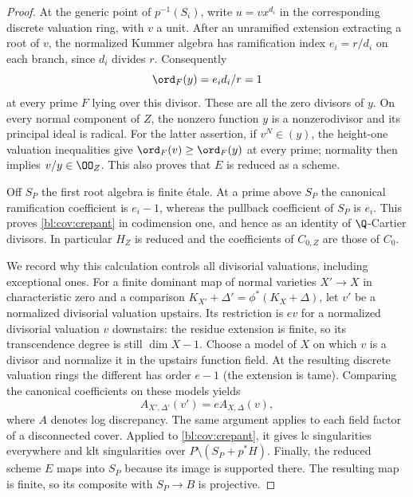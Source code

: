 \begin{proof}
At the generic point of $p^{-1}(S_i)$, write $u=vx^{d_i}$ in the
corresponding discrete valuation ring, with $v$ a unit.  After an
unramified extension extracting a root of $v$, the normalized Kummer
algebra has ramification index $e_i=r/d_i$ on each branch, since $d_i$
divides $r$.  Consequently
\[
 \ord_F(y)=e_id_i/r=1
\]
at every prime $F$ lying over this divisor.  These are all the zero
divisors of $y$.  On every normal component of $Z$, the nonzero function
$y$ is a nonzerodivisor and its principal ideal is radical.  For the
latter assertion, if $v^N\in(y)$, the height-one valuation inequalities
give $\ord_F(v)\geq\ord_F(y)$ at every prime; normality then implies
$v/y\in\OO_Z$.  This also proves that $E$ is reduced as a scheme.

Off $S_P$ the first root algebra is finite \'{e}tale.  At a prime above
$S_P$ the canonical ramification coefficient is $e_i-1$, whereas the
pullback coefficient of $S_P$ is $e_i$.  This proves
\eqref{bl:cov:crepant} in codimension one, and hence as an identity of
$\Q$-Cartier divisors.  In particular $H_Z$ is reduced and the
coefficients of $C_{0,Z}$ are those of $C_0$.

We record why this calculation controls all divisorial valuations,
including exceptional ones.  For a finite dominant map of normal
varieties $X'\to X$ in characteristic zero and a comparison
$K_{X'}+\Delta'=\phi^*(K_X+\Delta)$, let $v'$ be a normalized divisorial
valuation upstairs.  Its restriction is $e v$ for a normalized
divisorial valuation $v$ downstairs: the residue extension is finite,
so its transcendence degree is still $\dim X-1$.  Choose a model of $X$
on which $v$ is a divisor and normalize it in the upstairs function
field.  At the resulting discrete valuation rings the different has
order $e-1$ (the extension is tame).  Comparing the canonical
coefficients on these models yields
\begin{equation}\label{bl:cov:finite-discrepancy}
 A_{X',\Delta'}(v')=e A_{X,\Delta}(v),
\end{equation}
where $A$ denotes log discrepancy.  The same argument applies to each
field factor of a disconnected cover.  Applied to
\eqref{bl:cov:crepant}, it gives lc singularities everywhere and klt
singularities over $P\setminus(S_P+p^*H)$.  Finally, the reduced scheme
$E$ maps into $S_P$ because its image is supported there.  The resulting
map is finite, so its composite with $S_P\to B$ is projective.
\end{proof}

